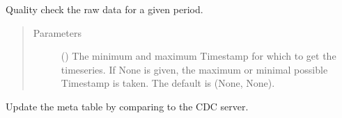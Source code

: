 \documentclass[letterpaper,10pt,english]{sphinxmanual}
\begin{document}
\begin{fulllineitems}
\begin{fulllineitems}
\end{fulllineitems}


\begin{fulllineitems}
\label{\detokenize{weatherDB:weatherDB.stations.StationsBase.quality_check}}
\sphinxAtStartPar
Quality check the raw data for a given period.
\begin{quote}\begin{description}
\item[{Parameters}] \leavevmode
\sphinxAtStartPar
{} (\sphinxstyleliteralemphasis{\sphinxupquote{, }}) \textendash{} The minimum and maximum Timestamp for which to get the timeseries.
If None is given, the maximum or minimal possible Timestamp is taken.
The default is (None, None).

\end{description}\end{quote}

\end{fulllineitems}


\begin{fulllineitems}
\label{\detokenize{weatherDB:weatherDB.stations.StationsBase.update_ma}}
\end{fulllineitems}


\begin{fulllineitems}
\label{\detokenize{weatherDB:weatherDB.stations.StationsBase.update_meta}}
\sphinxAtStartPar
Update the meta table by comparing to the CDC server.


\end{fulllineitems}
\end{fulllineitems}
\end{document}
